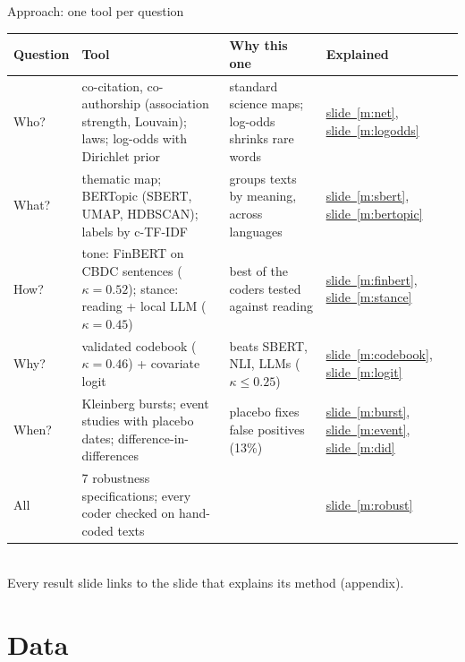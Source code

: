 \documentclass[aspectratio=169,10pt]{beamer}
\newcommand{\usedon}[1]{\hyperref[#1]{\textcolor{c4}{slide~\ref*{#1}}}}
\begin{document}
\begin{frame}{Approach: one tool per question}
\scriptsize
\setlength{\tabcolsep}{4pt}
\begin{tabular}{@{}lp{}p{}l@{}}\toprule
\textbf{Question} & \textbf{Tool} & \textbf{Why this one} & \textbf{Explained}\\\midrule
Who? & co-citation, co-authorship (association strength, Louvain); laws; log-odds with Dirichlet prior & standard science maps; log-odds shrinks rare words & \usedon{m:net}, \usedon{m:logodds}\\
What? & thematic map; \alert{BERTopic} (SBERT, UMAP, HDBSCAN); labels by \alert{c-TF-IDF} & groups texts by meaning, across languages & \usedon{m:sbert}, \usedon{m:bertopic}\\
How? & tone: \alert{FinBERT} on CBDC sentences ($\kappa = 0.52$); stance: reading + \alert{local LLM} ($\kappa = 0.45$) & best of the coders tested against reading & \usedon{m:finbert}, \usedon{m:stance}\\
Why? & \alert{validated codebook} ($\kappa = 0.46$) + \alert{covariate logit} & beats SBERT, NLI, LLMs ($\kappa \le 0.25$) & \usedon{m:codebook}, \usedon{m:logit}\\
When? & \alert{Kleinberg bursts}; \alert{event studies} with placebo dates; \alert{difference-in-differences} & placebo fixes false positives (13\%) & \usedon{m:burst}, \usedon{m:event}, \usedon{m:did}\\\midrule
All & 7 robustness specifications; every coder checked on hand-coded texts & & \usedon{m:robust}\\
\bottomrule\end{tabular}\\[4pt]
\small Every result slide links to the slide that explains its method (appendix).
\end{frame}

\section{Data}
\end{document}
